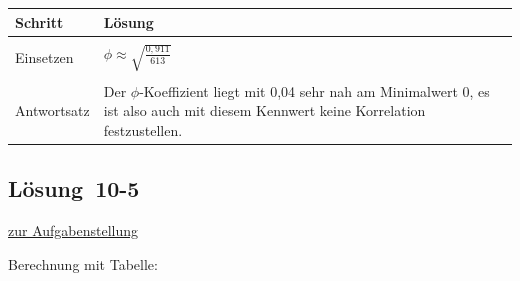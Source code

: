 \documentclass[
  11pt,
  ngerman,
  a4paper,
]{report}
\begin{document}
\begin{enumerate}
  \begin{table}[H]
   \centering
   \begin{tabular}{l>{\raggedright\arraybackslash}p{8cm}}
   \toprule
   \textbf{Schritt} & \textbf{Lösung}\\
   \midrule
   \cellcolor{gray!6}{Formel} & \cellcolor{gray!6}{$\phi=\sqrt{\frac{\chi^2}{n}}$}\\
   Einsetzen & $\phi\approx\sqrt{\frac{0{,}911}{613}}$\\
   \cellcolor{gray!6}{Ergebnis} & \cellcolor{gray!6}{$\phi\approx0{,}04$}\\
   Antwortsatz & Der $\phi$-Koeffizient liegt mit 0,04 sehr nah am Minimalwert 0, es ist also auch mit diesem Kennwert keine Korrelation festzustellen.\\
   \bottomrule
   \end{tabular}
   \end{table}
\end{enumerate}

\hypertarget{loesung-10-5}{%
\subsection{Lösung~10-5}\label{loesung-10-5}}

\protect\hyperlink{aufgabe-10-5}{zur Aufgabenstellung}

Berechnung mit Tabelle:
\end{document}
